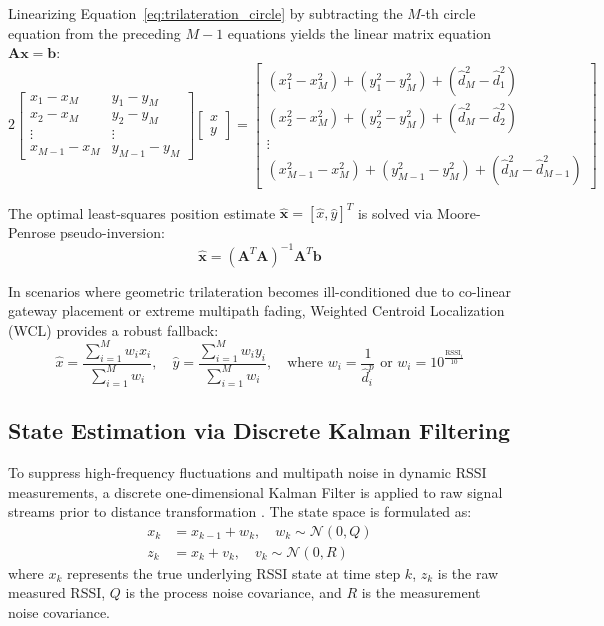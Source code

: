 Linearizing Equation~\eqref{eq:trilateration_circle} by subtracting the $M$-th circle equation from the preceding $M-1$ equations yields the linear matrix equation $\mathbf{A} \mathbf{x} = \mathbf{b}$:
\begin{equation}
\label{eq:trilateration_matrix}
2 \begin{bmatrix}
x_1 - x_M & y_1 - y_M \\
x_2 - x_M & y_2 - y_M \\
\vdots & \vdots \\
x_{M-1} - x_M & y_{M-1} - y_M
\end{bmatrix}
\begin{bmatrix}
x \\ y
\end{bmatrix}
=
\begin{bmatrix}
(x_1^2 - x_M^2) + (y_1^2 - y_M^2) + (\hat{d}_M^2 - \hat{d}_1^2) \\
(x_2^2 - x_M^2) + (y_2^2 - y_M^2) + (\hat{d}_M^2 - \hat{d}_2^2) \\
\vdots \\
(x_{M-1}^2 - x_M^2) + (y_{M-1}^2 - y_M^2) + (\hat{d}_M^2 - \hat{d}_{M-1}^2)
\end{bmatrix}
\end{equation}

The optimal least-squares position estimate $\hat{\mathbf{x}} = [\hat{x}, \hat{y}]^T$ is solved via Moore-Penrose pseudo-inversion:
\begin{equation}
\label{eq:least_squares_solution}
\hat{\mathbf{x}} = (\mathbf{A}^T \mathbf{A})^{-1} \mathbf{A}^T \mathbf{b}
\end{equation}

In scenarios where geometric trilateration becomes ill-conditioned due to co-linear gateway placement or extreme multipath fading, Weighted Centroid Localization (WCL) provides a robust fallback:
\begin{equation}
\label{eq:weighted_centroid}
\hat{x} = \frac{\sum_{i=1}^M w_i x_i}{\sum_{i=1}^M w_i}, \quad \hat{y} = \frac{\sum_{i=1}^M w_i y_i}{\sum_{i=1}^M w_i}, \quad \text{where } w_i = \frac{1}{\hat{d}_i^p} \text{ or } w_i = 10^{\frac{\text{RSSI}_i}{10}}
\end{equation}

\subsection{State Estimation via Discrete Kalman Filtering}
To suppress high-frequency fluctuations and multipath noise in dynamic RSSI measurements, a discrete one-dimensional Kalman Filter is applied to raw signal streams prior to distance transformation \cite{kalman_ble_filter}. The state space is formulated as:
\begin{align}
x_k &= x_{k-1} + w_k, \quad w_k \sim \mathcal{N}(0, Q) \label{eq:kf_process} \\
z_k &= x_k + v_k, \quad v_k \sim \mathcal{N}(0, R) \label{eq:kf_measure}
\end{align}
where $x_k$ represents the true underlying RSSI state at time step $k$, $z_k$ is the raw measured RSSI, $Q$ is the process noise covariance, and $R$ is the measurement noise covariance.

